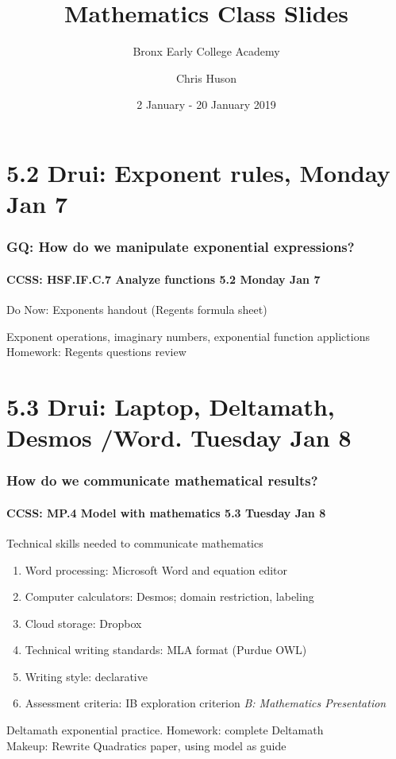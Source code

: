 \documentclass{beamer}
\title{Mathematics Class Slides}
\subtitle{Bronx Early College Academy}
\author{Chris Huson}
\date{2 January - 20 January 2019}
\begin{document}
\frame{\titlepage}

\section[Outline]{}
\frame{\tableofcontents}

  \section{5.2 Drui: Exponent rules, Monday Jan 7}
    \frame
    {
      \frametitle{GQ: How do we manipulate exponential expressions?}
      \framesubtitle{CCSS: HSF.IF.C.7 Analyze functions    \alert{5.2  Monday Jan 7}}

      \begin{block}{Do Now: Exponents handout (Regents formula sheet)}
      \end{block}
      Exponent operations, imaginary numbers, exponential function applictions \\ \bigskip
      Homework: Regents questions review
    }

  \section{5.3 Drui: Laptop, Deltamath, Desmos /Word. Tuesday Jan 8}
    \frame
    {
      \frametitle{How do we communicate mathematical results?}
      \framesubtitle{CCSS: MP.4 Model with mathematics  \alert{5.3 Tuesday Jan 8}}

      \begin{block}{Technical skills needed to communicate mathematics}
      \begin{enumerate}
          \item Word processing: Microsoft Word and equation editor
          \item Computer calculators: Desmos; domain restriction, labeling
          \item Cloud storage: Dropbox
          \item Technical writing standards: MLA format (Purdue OWL)
          \item Writing style: declarative
          \item Assessment criteria: IB exploration criterion \emph{B: Mathematics Presentation}
      \end{enumerate}
      \end{block}
      Deltamath exponential practice. Homework: complete Deltamath \\
      Makeup: Rewrite Quadratics paper, using model as guide
      }
\end{document}
